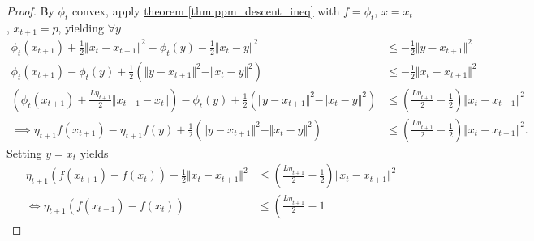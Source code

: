 \documentclass[12pt]{article}
\begin{document}
        \begin{proof}
            By $\phi_t$ convex, apply \hyperref[thm:ppm_descent_ineq]{theorem \ref*{thm:ppm_descent_ineq}} with $f = \phi_t$, $x = x_t$, $x_{t + 1} = p$, yielding $\forall y$
            {\footnotesize
                \begin{align*}
                    \phi_t(x_{t + 1}) + \frac{1}{2}\Vert x_t - x_{t + 1}\Vert^2 
                    - 
                    \phi_t(y) - \frac{1}{2}\Vert x_t - y\Vert^2
                    &\le 
                    - \frac{1}{2}\Vert y - x_{t + 1}\Vert^2
                    \\
                    \phi_t(x_{t + 1}) - \phi_t(y)
                    + \frac{1}{2}(
                        \Vert y - x_{t + 1}\Vert^2 - \Vert x_t - y\Vert^2 
                    ) &\le 
                    - \frac{1}{2} \Vert x_t - x_{t + 1}\Vert^2
                    \\
                    \left(
                        \phi_t(x_{t + 1}) + \frac{L\eta_{t + 1}}{2}\Vert x_{t + 1} - x_t\Vert
                    \right)
                    - \phi_t(y)
                    + \frac{1}{2}(
                        \Vert y - x_{t + 1}\Vert^2 - \Vert x_t - y\Vert^2 
                    ) &\le 
                    \left(
                        \frac{L\eta_{t + 1}}{2}- \frac{1}{2}
                    \right) \Vert x_t - x_{t + 1}\Vert^2
                    \\
                    \implies 
                    \eta_{t + 1}f(x_{t + 1}) - \eta_{t + 1}f(y) 
                    + \frac{1}{2}(
                        \Vert y - x_{t + 1}\Vert^2 - \Vert x_t - y\Vert^2 
                    ) 
                    &\le 
                    \left(
                        \frac{L\eta_{t + 1}}{2}- \frac{1}{2}
                    \right) \Vert x_t - x_{t + 1}\Vert^2. 
                \end{align*}
            }
            Setting $y = x_t$ yields
            \begin{align*}
                \eta_{t + 1}(f(x_{t + 1}) - f(x_t)) + 
                \frac{1}{2}
                    \Vert x_t - x_{t + 1}\Vert^2
                &\le 
                \left(
                        \frac{L\eta_{t + 1}}{2}- \frac{1}{2}
                \right) \Vert x_t - x_{t + 1}\Vert^2
                \\
                \iff 
                \eta_{t + 1}(f(x_{t + 1}) - f(x_t))
                &\le 
                \left(
                        \frac{L\eta_{t + 1}}{2} - 1

\end{align*}
\end{proof}
\end{document}
